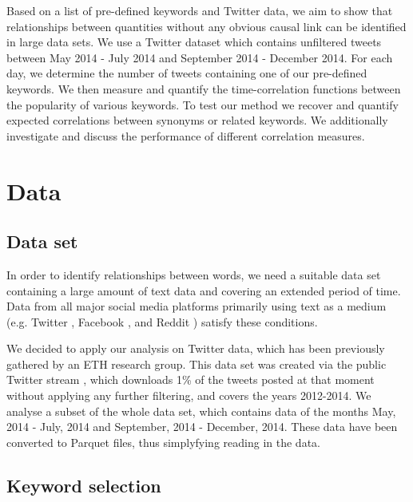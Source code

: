 \documentclass[12pt, a4paper]{article}
\begin{document}
Based on a list of pre-defined keywords and Twitter data, we aim to show that relationships between quantities without any obvious causal link can be identified in large data sets. 
We use a Twitter dataset which contains unfiltered tweets between May 2014 - July 2014 and September 2014 - December 2014. For each day, we determine the number of tweets containing one of our pre-defined keywords. We then measure and quantify the time-correlation functions between the popularity of various keywords. To test our method we recover and quantify expected correlations between synonyms or related keywords. We  additionally investigate and discuss the performance of different correlation measures.

\section{Data}
\subsection{Data set}\label{sec:data}
In order to identify relationships between words, we need a suitable data set containing a large amount of text data and covering an extended period of time. Data from all major social media platforms primarily using text as a medium (e.g. Twitter \cite{twitter}, Facebook \cite{facebook}, and Reddit \cite{reddit}) satisfy these conditions.

We decided to apply our analysis on Twitter data, which has been previously gathered by an ETH research group. This data set was created via the public Twitter stream \cite{twitterstream}, which downloads 1\% of the tweets posted at that moment without applying any further filtering, and covers the years 2012-2014. We analyse a subset of the whole data set, which contains data of the months May, 2014 - July, 2014 and September, 2014 - December, 2014. These data have been converted to Parquet files, thus simplyfying reading in the data.

\subsection{Keyword selection}
\end{document}
